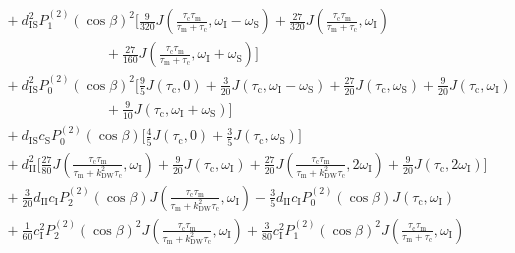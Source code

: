 \begin{appendixtext}
\begin{equation*}
\begin{split}
&\hspace{4pt}+d_{\text{IS}}^2P_1^{(2)}(\cos\beta)^2\bigg[\frac{9}{320}J\left(\frac{\tau_{\text{c}}\tau_{\text{m}}}{\tau_{\text{m}}+\tau_{\text{c}}},\omega_{\text{I}}-\omega_{\text{S}}\right)+\frac{27}{320}J\left(\frac{\tau_{\text{c}}\tau_{\text{m}}}{\tau_{\text{m}}+\tau_{\text{c}}},\omega_{\text{I}}\right) \\ 
&\hspace{90pt}+\frac{27}{160}J\left(\frac{\tau_{\text{c}}\tau_{\text{m}}}{\tau_{\text{m}}+\tau_{\text{c}}},\omega_{\text{I}}+\omega_{\text{S}}\right)\bigg] \\
&\hspace{4pt}+d_{\text{IS}}^2P_0^{(2)}(\cos\beta)^2\bigg[\frac{9}{5}J(\tau_{\text{c}},0)+\frac{3}{20}J\left(\tau_{\text{c}},\omega_{\text{I}}-\omega_{\text{S}}\right)+\frac{27}{20}J\left(\tau_{\text{c}},\omega_{\text{S}}\right)+\frac{9}{20}J\left(\tau_{\text{c}},\omega_{\text{I}}\right) \\ 
&\hspace{90pt}+\frac{9}{10}J\left(\tau_{\text{c}},\omega_{\text{I}}+\omega_{\text{S}}\right)\bigg] \\
&\hspace{4pt}+d_{\text{IS}}c_{\text{S}}P_0^{(2)}(\cos\beta)\bigg[\frac{4}{5}J\left(\tau_{\text{c}},0\right)+\frac{3}{5}J\left(\tau_{\text{c}},\omega_{\text{S}}\right)\bigg] \\
&\hspace{4pt}+d_{\text{II}}^2\bigg[\frac{27}{80}J\left(\frac{\tau_{\text{c}}\tau_{\text{m}}}{\tau_{\text{m}}+k_{\text{DW}}^2\tau_{\text{c}}},\omega_{\text{I}}\right)+\frac{9}{20}J\left(\tau_{\text{c}},\omega_{\text{I}}\right)+\frac{27}{20}J\left(\frac{\tau_{\text{c}}\tau_{\text{m}}}{\tau_{\text{m}}+k_{\text{DW}}^2\tau_{\text{c}}},2\omega_{\text{I}}\right)+\frac{9}{20}J\left(\tau_{\text{c}},2\omega_{\text{I}}\right)\bigg] \\
&\hspace{4pt}+ \frac{3}{20} d_{\text{II}}c_{\text{I}}P_2^{(2)}(\cos\beta) J\left(\frac{\tau_{\text{c}}\tau_{\text{m}}}{\tau_{\text{m}}+k_{\text{DW}}^2\tau_{\text{c}}},\omega_{\text{I}}\right)- \frac{3}{5} d_{\text{II}}c_{\text{I}}P_0^{(2)}(\cos\beta) J\left(\tau_{\text{c}},\omega_{\text{I}}\right) \\ 
&\hspace{4pt}+\frac{1}{60} c_{\text{I}}^2P_2^{(2)}(\cos\beta)^2 J\left(\frac{\tau_{\text{c}}\tau_{\text{m}}}{\tau_{\text{m}}+k_{\text{DW}}^2\tau_{\text{c}}},\omega_{\text{I}}\right)+\frac{3}{80} c_{\text{I}}^2P_1^{(2)}(\cos\beta)^2 J\left(\frac{\tau_{\text{c}}\tau_{\text{m}}}{\tau_{\text{m}}+\tau_{\text{c}}},\omega_{\text{I}}\right) \\

\end{split}
\end{equation*}
\end{appendixtext}
